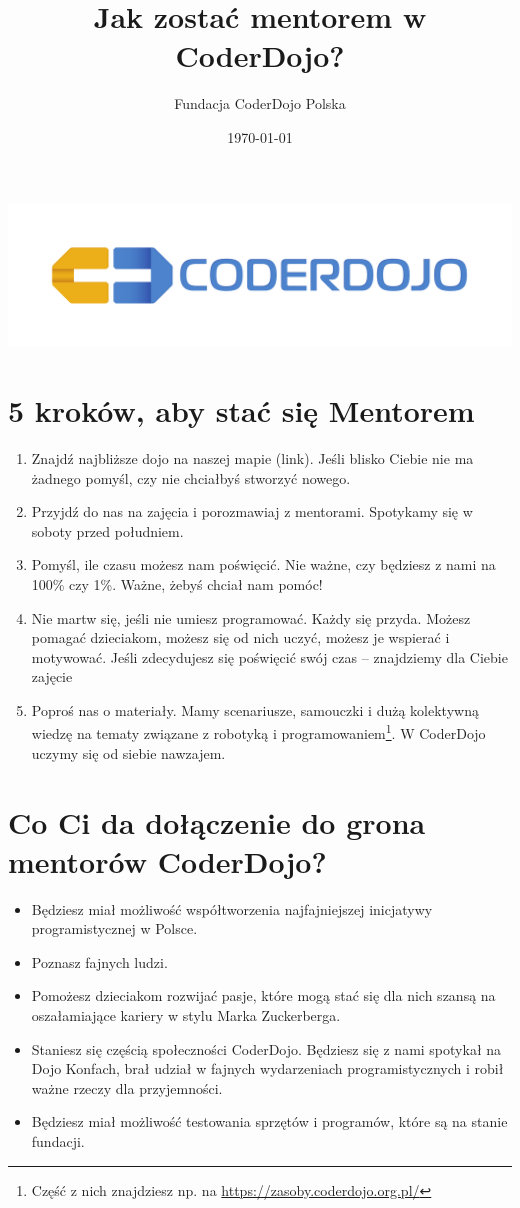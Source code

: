 \documentclass[a4paper]{article}
\title{Jak zostać mentorem w CoderDojo?}
\author{Fundacja CoderDojo Polska}
\date{\today}
\begin{document}
\maketitle
\includegraphics[width=\textwidth]{logo_CD.pdf}

\section{5 kroków, aby stać się Mentorem}

\begin{enumerate}
\item Znajdź najbliższe dojo na naszej mapie (link). Jeśli blisko Ciebie nie ma żadnego pomyśl, czy nie chciałbyś stworzyć nowego. 
\item Przyjdź do nas na zajęcia i porozmawiaj z mentorami. Spotykamy się w soboty przed południem. 
\item Pomyśl, ile czasu możesz nam poświęcić. Nie ważne, czy będziesz z nami na 100\% czy 1\%. Ważne, żebyś chciał nam pomóc!
\item Nie martw się, jeśli nie umiesz programować. Każdy się przyda. Możesz pomagać dzieciakom, możesz się od nich uczyć, możesz je wspierać i motywować. Jeśli zdecydujesz się poświęcić swój czas – znajdziemy dla Ciebie zajęcie 
\item Poproś nas o materiały. Mamy scenariusze, samouczki i dużą kolektywną wiedzę na tematy związane z robotyką i programowaniem\footnote{Część z nich znajdziesz np. na \url{https://zasoby.coderdojo.org.pl/}}. W CoderDojo uczymy się od siebie nawzajem. 
\end{enumerate}
\section{Co Ci da dołączenie do grona mentorów CoderDojo?}
\begin{itemize}
\item Będziesz miał możliwość współtworzenia najfajniejszej inicjatywy programistycznej w Polsce. 
\item Poznasz fajnych ludzi.  
\item Pomożesz dzieciakom rozwijać pasje, które mogą stać się dla nich szansą na oszałamiające kariery w stylu Marka Zuckerberga. 
\item Staniesz się częścią  społeczności CoderDojo. Będziesz się z nami spotykał na Dojo Konfach, brał udział w fajnych wydarzeniach programistycznych i robił ważne rzeczy dla przyjemności. 
\item Będziesz miał możliwość testowania sprzętów i programów, które są na stanie fundacji. 
\end{itemize}
\end{document}
